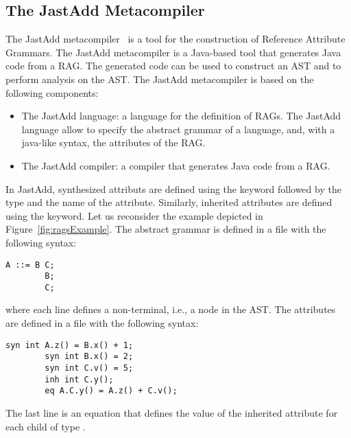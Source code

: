 \subsection{The JastAdd Metacompiler}
\label{sec:jastadd}
The JastAdd metacompiler~\cite{DBLP:journals/entcs/HedinM01} is a tool for the construction of
Reference Attribute Grammars. The JastAdd metacompiler is a Java-based tool that generates
Java code from a RAG. The generated code can be used to construct an AST and to perform
analysis on the AST.
The JastAdd metacompiler is based on the following components:
\begin{itemize}
    \item The JastAdd language: a language for the definition of RAGs.
    The JastAdd language allow to specify the abstract grammar of a language, and,
    with a java-like syntax, the attributes of the RAG.
    \item The JastAdd compiler: a compiler that generates Java code from a RAG.
\end{itemize}
In JastAdd, synthesized attributs are defined using the  keyword followed
by the type and the name of the attribute. Similarly, inherited attributes are defined
using the  keyword. Let us reconsider the example depicted in Figure~\ref{fig:ragsExample}.
The abstract grammar is defined in a  file with the following syntax:
    \begin{lstlisting}[language=JastAdd]
        A ::= B C;
        B;
        C;
    \end{lstlisting}
where each line defines a non-terminal, i.e., a node in the AST.
The attributes are defined in a  file with the following syntax:
    \begin{lstlisting}[language=JastAdd]
        syn int A.z() = B.x() + 1;
        syn int B.x() = 2;
        syn int C.v() = 5;
        inh int C.y();
        eq A.C.y() = A.z() + C.v();
    \end{lstlisting}
The last line is an equation that defines the value of the inherited attribute  for each child of type .

